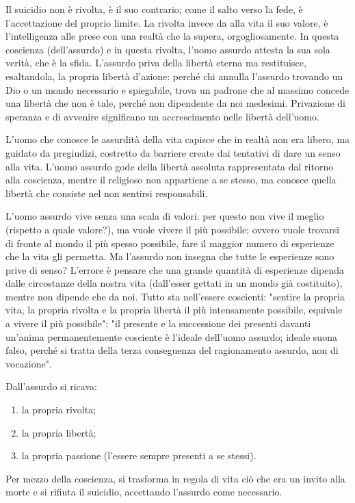\documentclass[a4paper,12pt,oneside]{article}%
\begin{document}
Il suicidio non è rivolta, è il suo contrario; come il
salto verso la fede, è l'accettazione del proprio
limite.
La rivolta invece da alla vita il suo valore, è
l'intelligenza alle prese con una realtà che la
supera, orgogliosamente. In questa coscienza (dell'assurdo) e in questa rivolta, l'uomo assurdo
attesta la sua sola verità, che è la sfida.
L'assurdo priva della libertà eterna ma restituisce,
esaltandola, la propria libertà d'azione: perché chi
annulla l'assurdo trovando un Dio o un mondo
necessario e spiegabile, trova un padrone che al
massimo concede una libertà che non è tale,
perché non dipendente da noi medesimi.
Privazione di speranza e di avvenire significano un
accrescimento nelle libertà dell'uomo.

L'uomo che
conosce le assurdità della vita capisce che
in realtà non era libero, ma guidato da pregiudizi, costretto da barriere create dai tentativi di dare
un senso alla vita.
L'uomo assurdo gode della libertà assoluta
rappresentata dal ritorno alla coscienza, mentre il
religioso non appartiene a se stesso, ma conosce
quella libertà che consiste nel non sentirsi
responsabili.

L'uomo assurdo vive senza una scala di
valori: per questo non vive il meglio (rispetto a
quale valore?), ma vuole vivere il più
possibile; ovvero vuole trovarsi di fronte al
mondo il più spesso possibile, fare il maggior
numero di esperienze che la vita gli permetta.
Ma l'assurdo non insegna che tutte le esperienze
sono prive di senso?
L'errore è pensare che una grande quantità di
esperienze dipenda dalle circostanze della
nostra vita (dall'esser gettati in un mondo già
costituito), mentre non dipende che da noi.
Tutto sta nell'essere coscienti: "sentire la propria
vita, la propria rivolta e la propria libertà il
più intensamente possibile, equivale a vivere il
più possibile"; "il presente e la successione
dei presenti davanti un'anima permanentemente
cosciente è l'ideale dell'uomo assurdo;
ideale suona falso, perché si tratta della terza
conseguenza del ragionamento assurdo, non di
vocazione".

Dall'assurdo si ricava:
\begin{enumerate}
	\item  la propria rivolta;
	\item  la propria libertà;
	\item  la propria passione (l'essere sempre presenti a
	se stessi).
\end{enumerate}


Per mezzo della coscienza, si trasforma in regola
di vita ciò che era un invito alla morte e si
rifiuta il suicidio, accettando l'assurdo come
necessario.
\end{document}
